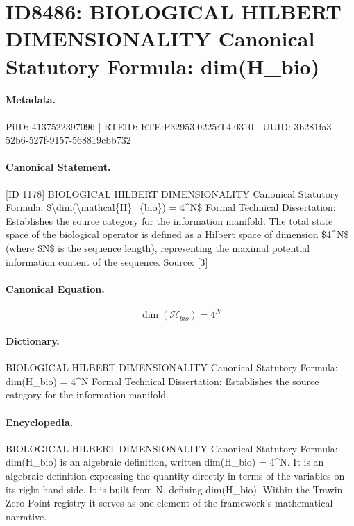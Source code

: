 \section*{ID8486: BIOLOGICAL HILBERT DIMENSIONALITY Canonical Statutory Formula: dim(H\_bio)}
\paragraph{Metadata.}
PiID: 4137522397096 | RTEID: RTE:P32953.0225:T4.0310 | UUID: 3b281fa3-52b6-527f-9157-568819cbb732

\paragraph{Canonical Statement.}
[ID 1178] BIOLOGICAL HILBERT DIMENSIONALITY Canonical Statutory Formula: \$\textbackslash{}dim(\textbackslash{}mathcal\{H\}\_\{bio\}) = 4\textasciicircum{}N\$ Formal Technical Dissertation: Establishes the source category for the information manifold. The total state space of the biological operator is defined as a Hilbert space of dimension \$4\textasciicircum{}N\$ (where \$N\$ is the sequence length), representing the maximal potential information content of the sequence. Source: [3]

\paragraph{Canonical Equation.}
\[
\dim(\mathcal{H}_{bio}) = 4^N
\]

\paragraph{Dictionary.}
BIOLOGICAL HILBERT DIMENSIONALITY Canonical Statutory Formula: dim(H\_bio) = 4\textasciicircum{}N Formal Technical Dissertation: Establishes the source category for the information manifold.

\paragraph{Encyclopedia.}
BIOLOGICAL HILBERT DIMENSIONALITY Canonical Statutory Formula: dim(H\_bio) is an algebraic definition, written dim(H\_bio) = 4\textasciicircum{}N. It is an algebraic definition expressing the quantity directly in terms of the variables on its right-hand side. It is built from N, defining dim(H\_bio). Within the Trawin Zero Point registry it serves as one element of the framework's mathematical narrative.
